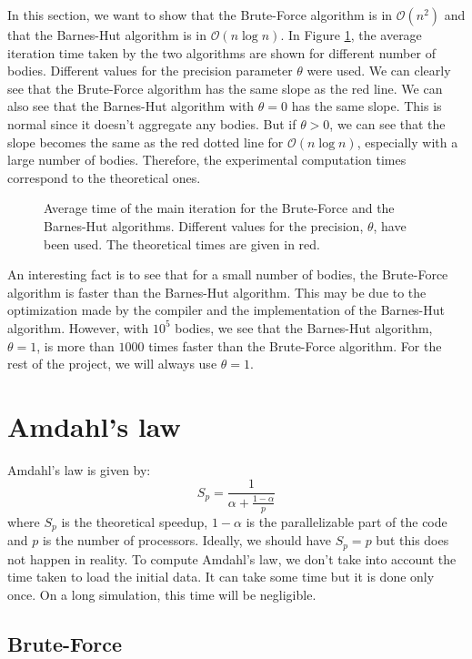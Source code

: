 \documentclass[10pt,a4paper]{article}
\begin{document}
In this section, we want to show that the Brute-Force algorithm is in $\mathcal{O}(n^2)$ and that the Barnes-Hut algorithm is in $\mathcal{O}(n\log n)$. In Figure \ref{fig:algo_time}, the average iteration time taken by the two algorithms are shown for different number of bodies. Different values for the precision parameter $\theta$ were used. We can clearly see that the Brute-Force algorithm has the same slope as the red line. We can also see that the Barnes-Hut algorithm with $\theta=0$ has the same slope. This is normal since it doesn't aggregate any bodies. But if $\theta>0$, we can see that the slope becomes the same as the red dotted line for $\mathcal{O}(n\log n)$, especially with a large number of bodies. Therefore, the experimental computation times correspond to the theoretical ones.

\begin{figure}[H]
\centering

\caption{\label{fig:algo_time} Average time of the main iteration for the Brute-Force and the Barnes-Hut algorithms. Different values for the precision, $\theta$, have been used. The theoretical times are given in red.}
\end{figure}

An interesting fact is to see that for a small number of bodies, the Brute-Force algorithm is faster than the Barnes-Hut algorithm. This may be due to the optimization made by the compiler and the implementation of the Barnes-Hut algorithm. However, with $10^5$ bodies, we see that the Barnes-Hut algorithm, $\theta=1$, is more than $1000$ times faster than the Brute-Force algorithm. For the rest of the project, we will always use $\theta=1$.

\section{Amdahl's law}

Amdahl's law is given by:
\begin{equation}
S_{p} = \frac{1}{\alpha + \frac{1-\alpha}{p}}
\end{equation}
where $S_{p}$ is the theoretical speedup, $1-\alpha$ is the parallelizable part of the code and $p$ is the number of processors. Ideally, we should have $S_p = p$ but this does not happen in reality. To compute Amdahl's law, we don't take into account the time taken to load the initial data. It can take some time but it is done only once. On a long simulation, this time will be negligible.

\subsection{Brute-Force}
\end{document}
